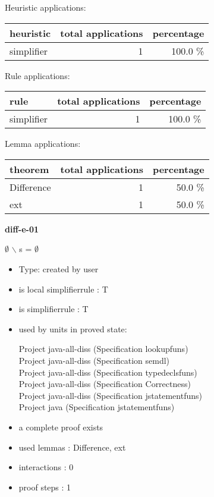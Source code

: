 \documentclass[a4paper]{article}
\begin{document}
\medskip


Heuristic applications:

\begin{supertabular}{l|r|r}
heuristic	& total applications & percentage \\ \hline
simplifier & 1 & 100.0 \% \\

\end{supertabular}

Rule applications:

\begin{supertabular}{l|r|r}
rule	        & total applications & percentage \\ \hline
simplifier & 1 & 100.0 \% \\

\end{supertabular}

Lemma applications:

\begin{supertabular}{l|r|r}
theorem	        & total applications & percentage \\ \hline
Difference & 1 & 50.0 \% \\
ext & 1 & 50.0 \% \\

\end{supertabular}
\pagebreak

{\LARGE\bf diff-e-01}\label{lemma-diff-e-01}

\medskip

 \Fol $\emptyset$ $\backslash$ s = $\emptyset$

\begin{itemize}

\item Type: created by user

\item is local simplifierrule : T
\item is simplifierrule : T
\item used by units in proved state:

Project java-all-diss (Specification lookupfuns) \\
Project java-all-diss (Specification semdl) \\
Project java-all-diss (Specification typedeclsfuns) \\
Project java-all-diss (Specification Correctness) \\
Project java-all-diss (Specification jstatementfuns) \\
Project java (Specification jstatementfuns)
\item       a complete proof exists
\item       used lemmas  : Difference, ext
\item       interactions : 0
\item       proof steps  : 1
\end{itemize}
\end{document}
